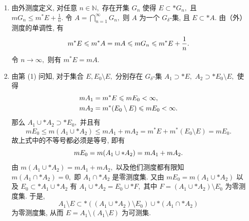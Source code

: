 \begin{solution}
\begin{enumerate}
\item 由外测度定义, 对任意 $n \in \mathbb{N},$ 存在开集 $G_n$ 使得 $E \subset* G_n,$ 且 $m G_n \leqslant m^* E + \frac{1}{n}.$ 
令 $A = \bigcap\limits_{n=1}^{\infty} G_n,$ 则 $A$ 为一个 $G_{\delta}$-集, 且 $E \subset* A.$ 由（外）测度的单调性, 有
\begin{equation*}
m^* E \leqslant m^* A = m A \leqslant m G_n \leqslant m^* E + \frac{1}{n}. \score{2}
\end{equation*}
令 $n \to \infty,$ 则有 $m^* E = m A.$ 

\item 由第 (1) 问知, 对于集合 $E, E_0 \setminus E,$ 分别存在 $G_{\delta}$-集 $A_1 \supset* E,$ $A_2 \supset* E_0 \setminus E,$ 使得
\begin{equation*}
\begin{aligned}
m A_1 & = m^* E \leqslant m E_0 < \infty, \\
m A_2 & = m^* (E_0 \setminus E) \leqslant m E_0 < \infty.
\end{aligned} \score{1}
\end{equation*}
那么 $A_1 \cup* A_2 \supset* E_0,$ 并且有
\begin{equation*}
m E_0 \leqslant m (A_1 \cup* A_2) \leqslant m A_1 + m A_2 = m^* E + m^* (E_0 \setminus E) = m E_0.
\end{equation*}
故上式中的不等号都必须是等号, 即有
\begin{equation*}
m E_0 = m (A_1 \cup* A_2) = m A_1 + m A_2. \score{2}
\end{equation*}
由 $m (A_1 \cup* A_2) = m A_1 + m A_2,$ 以及他们测度都有限知 $m (A_1 \cap* A_2) = 0,$ 即 $A_1 \cap* A_2$ 是零测度集. 又由 $m E_0 = m (A_1 \cup* A_2)$ 以及 $E_0 \subset* A_1 \cup* A_2$ 有 $A_1 \cup* A_2 = E_0 \cup* F,$
其中 $F = (A_1 \cup* A_2) \setminus E_0$ 为零测度集. 于是,
\begin{equation*}
A_1 \setminus E \subset* ((A_1 \cup* A_2) \setminus E_0) \cup* (A_1 \cap* A_2)
\end{equation*}
为零测度集, 从而 $E = A_1 \setminus (A_1 \setminus E)$ 为可测集. 
\end{enumerate}

\end{solution}



